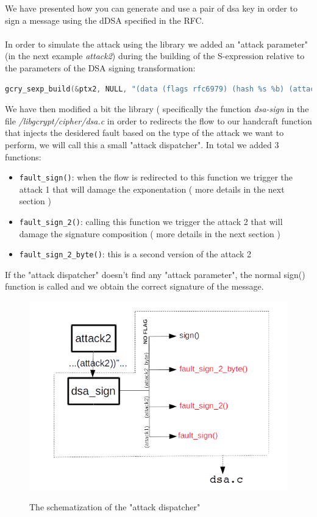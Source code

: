 \documentclass[11pt,english]{article}
\begin{document}
We have presented how you can generate and use a pair of dsa key in order to sign a message using the dDSA specified in the RFC\cite{rfc}. \\\\
In order to simulate the attack using the library we added an "attack parameter" (in the next example \textit{attack2}) during the building of the S-expression relative to the parameters of the DSA signing transformation:

\begin{lstlisting}[language=c]
gcry_sexp_build(&ptx2, NULL, "(data (flags rfc6979) (hash %s %b) (attack2))" , "sha1", hash_len , digest);
\end{lstlisting}

We have then modified a bit the library ( specifically the function \textit{dsa-sign} in the file \textit{/libgcrypt/cipher/dsa.c} in order to redirects the flow to our handcraft function that injects the desidered fault based on the type of the attack we want to perform, we will call this a small "attack dispatcher". In total we added 3 functions:
\begin{itemize}
\item \texttt{fault\_sign()}: when the flow is redirected to this function we trigger the attack 1 that will damage the exponentation ( more details in the next section )
\item \texttt{fault\_sign\_2()}: calling this function we trigger the attack 2 that will damage the signature composition ( more details in the next section )
\item \texttt{fault\_sign\_2\_byte()}: this is a second version of the attack 2
\end{itemize}

If the "attack dispatcher" doesn't find any "attack parameter", the normal sign() function is called and we obtain the correct signature of the message. 

\begin{figure}[H]
\includegraphics[width=1.0\textwidth]{img/img_3.png} \\
\caption{The schematization of the "attack dispatcher"}
\end{figure}
\end{document}
